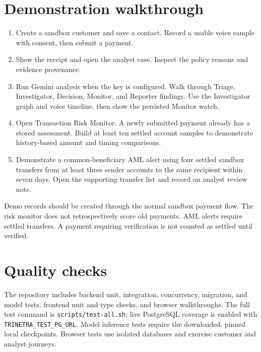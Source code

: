 \documentclass[11pt,a4paper]{article}
\begin{document}
\section{Demonstration walkthrough}
\begin{enumerate}
\item Create a sandbox customer and save a contact. Record a usable voice sample with consent, then submit a payment.
\item Show the receipt and open the analyst case. Inspect the policy reasons and evidence provenance.
\item Run Gemini analysis when the key is configured. Walk through Triage, Investigator, Decision, Monitor, and Reporter findings. Use the Investigator graph and voice timeline, then show the persisted Monitor watch.
\item Open Transaction Risk Monitor. A newly submitted payment already has a stored assessment. Build at least ten settled account samples to demonstrate history-based amount and timing comparisons.
\item Demonstrate a common-beneficiary AML alert using four settled sandbox transfers from at least three sender accounts to the same recipient within seven days. Open the supporting transfer list and record an analyst review note.
\end{enumerate}
Demo records should be created through the normal sandbox payment flow. The risk monitor does not retrospectively score old payments. AML alerts require settled transfers. A payment requiring verification is not counted as settled until verified.

\section{Quality checks}
The repository includes backend unit, integration, concurrency, migration, and model tests, frontend unit and type checks, and browser walkthroughs. The full test command is \texttt{scripts/test-all.sh}; live PostgreSQL coverage is enabled with \texttt{TRINETRA\_TEST\_PG\_URL}. Model inference tests require the downloaded, pinned local checkpoints. Browser tests use isolated databases and exercise customer and analyst journeys.
\end{document}
